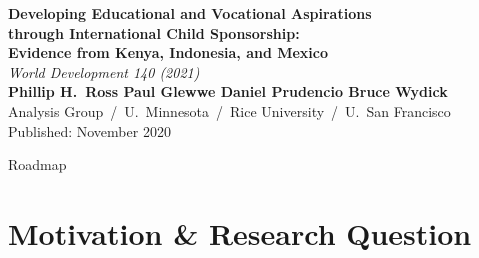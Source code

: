 \documentclass[aspectratio=169, 10pt]{beamer}
\begin{document}
\begin{frame}[plain]
  \vspace{1.5em}
  \begin{center}
    {\color{navyblue}\Large\bfseries
      Developing Educational and Vocational Aspirations\\[0.3em]
      through International Child Sponsorship:\\[0.3em]
      Evidence from Kenya, Indonesia, and Mexico}\\[1em]
    {\color{institutgold}\large\itshape World Development 140 (2021)}\\[1.5em]
    {\color{navyblue}\normalsize\bfseries
      Phillip H.\ Ross \quad Paul Glewwe \quad Daniel Prudencio \quad Bruce Wydick}\\[0.3em]
    {\color{medgray}\small Analysis Group \,/\, U.\ Minnesota \,/\, Rice University \,/\, U.\ San Francisco}\\[1.5em]
    {\color{institutgold}\small Published: November 2020}
  \end{center}
\end{frame}

\begin{frame}{Roadmap}
  \tableofcontents
\end{frame}

\section{Motivation \& Research Question}
\end{document}
